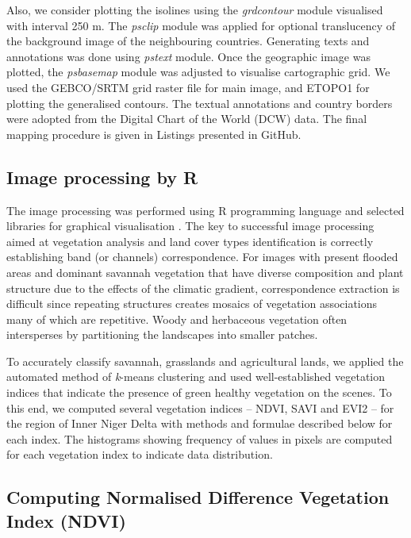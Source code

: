 \documentclass[12pt,a4paper,oneside]{article}
\def \newpar{\vspace{6pt}}
\begin{document}
\newpar Also, we consider plotting the isolines using the \emph{grdcontour} module visualised with interval 250 m. The \emph{psclip} module was applied for optional translucency of the background image of the neighbouring countries. Generating texts and annotations was done using \emph{pstext} module. Once the geographic image was plotted, the \emph{psbasemap} module was adjusted to visualise cartographic grid. We used the GEBCO/SRTM grid raster file for main image, and ETOPO1 for plotting the generalised contours. The textual annotations and country borders were adopted from the Digital Chart of the World (DCW) data. The final mapping procedure is given in Listings presented in GitHub.

\subsection*{Image processing by R}

\newpar The image processing was performed using R programming language \citep{RCoreTeam} and selected libraries for graphical visualisation \citep{Murrell}. The key to successful image processing aimed at vegetation analysis and land cover types identification is correctly establishing band (or channels) correspondence. For images with present flooded areas and dominant savannah vegetation that have diverse composition and plant structure due to the effects of the climatic gradient, correspondence extraction is difficult since repeating structures creates mosaics of vegetation associations many of which are repetitive. Woody and herbaceous vegetation often intersperses by partitioning the landscapes into smaller patches. 

\newpar To accurately classify savannah, grasslands and agricultural lands, we applied the automated method of \emph{k}-means clustering and used well-established vegetation indices that indicate the presence of green healthy vegetation on the scenes. To this end, we computed several vegetation indices -- NDVI, SAVI and EVI2 -- for the region of Inner Niger Delta with methods and formulae described below for each index. The histograms showing frequency of values in pixels are computed for each vegetation index to indicate data distribution.

\subsection*{Computing Normalised Difference Vegetation Index (NDVI)}
\end{document}
